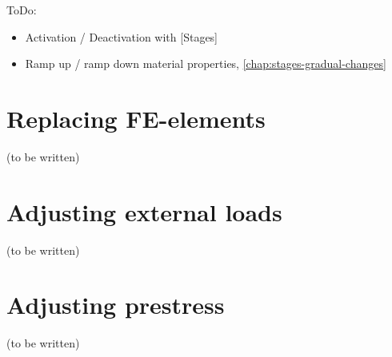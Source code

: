 ToDo:
\begin{itemize}
      \item Activation / Deactivation with [Stages]
      \item Ramp up / ramp down material properties, \autoref{chap:stages-gradual-changes}
\end{itemize}

\section{Replacing FE-elements}
\label{chap:stages-element-replacement}

(to be written)

\section{Adjusting external loads}
\label{chap:stages-loads}

(to be written)

\section{Adjusting prestress}
\label{chap:stages-prestress}

(to be written)